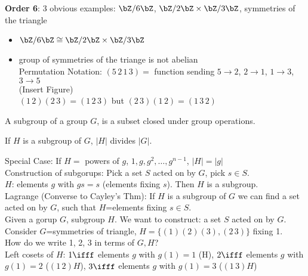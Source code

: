 \noindent
\textbf{Order 6}: 3 obvious examples: $\bZ/6\bZ$, $\bZ/2\bZ \times \bZ/3\bZ$, symmetries of the triangle \\
\begin{itemize}
    \item $\bZ/6\bZ \cong \bZ/2\bZ \times \bZ/3\bZ$ 
    \item group of symmetries of the triange is not abelian \\
    Permutation Notation: $(5 \, 2 \, 1 \, 3)=$ function sending $5 \to 2$, $2 \to 1$, $1 \to 3$, $3 \to 5$\\
    (Insert Figure) \\
    $(1 \, 2) (2 \, 3) = (1 \, 2 \, 3)$ but $(2 \, 3)(1 \, 2) = (1 \, 3 \, 2)$ 
\end{itemize}

\begin{definition}
    A subgroup of a group $G$, is a subset closed under group operations.
\end{definition}

\begin{theorem}
    If $H$ is a subgroup of $G$, $|H|$ divides $|G|$.
\end{theorem}
Special Case: If $H=$ powers of $g$, $1, g, g^2, \ldots, g^{n-1}$, $|H|=|g|$ \\

\noindent
Construction of subgorups: Pick a set $S$ acted on by $G$, pick $s \in S$. \\
$H$: elements $g$ with $gs=s$ (elements fixing $s$). Then $H$ is a subgroup. \\
Lagrange (Converse to Cayley's Thm): If $H$ is a subgroup of $G$ we can find a set acted on by $G$, such that $H$=elements fixing $s \in S$. \\

\noindent
Given a gorup $G$, subgroup $H$. We want to construct: a set $S$ acted on by $G$. \\
Consider $G$=symmetries of triangle, $H = \{ (1)(2)(3), (2 \, 3)\}$ fixing 1. \\
How do we write 1, 2, 3 in terms of $G, H$? \\
Left cosets of $H$: $1 \ifff$ elements $g$ with $g(1)=1$ (H), $2 \ifff $ elements $g$ with $g(1)=2$ ($(1 \, 2)H$), $3 \ifff $ elements $g$ with $g(1)=3$ ($(1 \, 3)H$) \\

